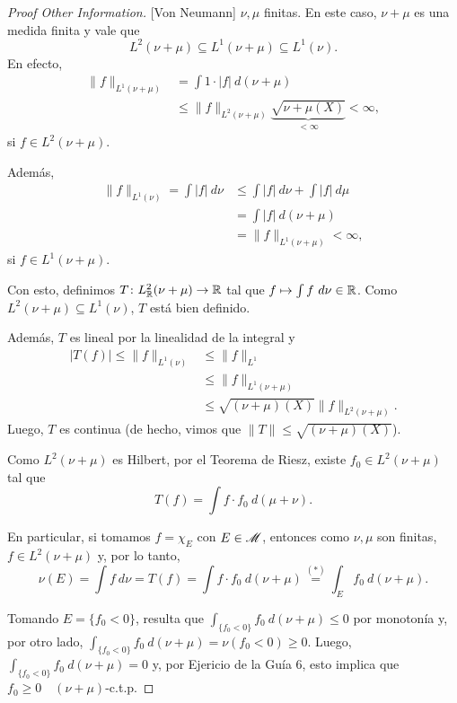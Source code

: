 
\begin{proof}[Proof Other Information][Von Neumann]
	 $\nu,\mu$ finitas. En este caso, $\nu + \mu$ es una medida finita y vale que
	\[ L^{2}(\nu + \mu) \subseteq L^{1}(\nu + \mu) \subseteq L^{1}(\nu). \]
	En efecto,
	\begin{align*}
		\| f \|_{L^{1}(\nu + \mu)} &= \int 1 \cdot |f| \ d(\nu + \mu) \\
		&\leq \| f \|_{L^{2}(\nu + \mu)} \underbrace{\sqrt{\nu + \mu (X)}}_{< \infty} < \infty
	,\end{align*}
	si $f \in L^{2}(\nu + \mu)$. \par
	Además,
	\begin{align*}
		\| f \|_{L^{1}(\nu)} = \int |f| \ d\nu &\leq \int |f| \ d\nu + \int |f| \ d\mu \\
		&= \int |f| \ d(\nu + \mu) \\
		&= \| f \|_{L^{1}(\nu + \mu)} < \infty
	,\end{align*}
	si $f \in L^{1}(\nu + \mu)$. \par
	Con esto, definimos $T \colon L_{\mathbb{R}}^{2}(\nu + \mu) \to \mathbb{R}$ tal que $f \mapsto \int f \ d\nu \in \mathbb{R}$. Como $L^{2}(\nu + \mu) \subseteq L^{1}(\nu)$, $T$ está bien definido. \par
	Además, $T$ es lineal por la linealidad de la integral y 
	\begin{align*}
		|T(f)| \leq \| f \|_{L^{1}(\nu)} &\leq \| f \|_{L^{1}} \\
		&\leq \| f \|_{L^{1}(\nu + \mu)} \\
		&\leq \sqrt{(\nu + \mu)(X)} \| f \|_{L^{2}(\nu + \mu)}
	.\end{align*}
	Luego, $T$ es continua (de hecho, vimos que $\| T \| \leq \sqrt{(\nu + \mu)(X)}$). \par
	Como $L^{2}(\nu + \mu)$ es Hilbert, por el Teorema de Riesz, existe $f_{0} \in L^{2}(\nu + \mu)$ tal que
	\[ T(f) = \int f \cdot f_{0} \ d(\mu + \nu). \]
	\par
	En particular, si tomamos $f = \chi_{E}$ con $E \in \mathscr{M}$, entonces como $\nu,\mu$ son finitas, $f \in L^{2}(\nu + \mu)$ y, por lo tanto, 
	\[ \nu(E) = \int f \ d\nu = T(f) = \int f \cdot f_{0} \ d(\nu + \mu) \stackrel{(*)}{=} \int_{E} f_{0} \ d(\nu + \mu). \]
	\par
	Tomando $E = \{f_{0} < 0\}$, resulta que $\int_{\{f_{0} < 0\}} f_{0} \ d(\nu + \mu) \leq 0$ por monotonía y, por otro lado, $\int_{\{f_{0} < 0\}} f_{0} \ d(\nu + \mu) = \nu(f_{0} < 0) \geq 0$. Luego, $\int_{\{f_{0} < 0\}} f_{0} \ d(\nu + \mu) = 0$ y, por Ejericio de la Guía 6, esto implica que $f_{0} \geq 0 \quad (\nu + \mu)$-c.t.p. \par

\end{proof}
